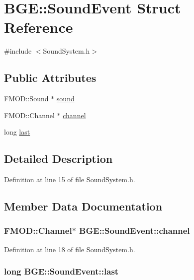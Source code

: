 \hypertarget{struct_b_g_e_1_1_sound_event}{\section{B\-G\-E\-:\-:Sound\-Event Struct Reference}
\label{struct_b_g_e_1_1_sound_event}
}


{\ttfamily \#include $<$Sound\-System.\-h$>$}

\subsection*{Public Attributes}
\begin{DoxyCompactItemize}
\item 
F\-M\-O\-D\-::\-Sound $\ast$ \hyperlink{struct_b_g_e_1_1_sound_event_ab7bb299636b2efed16e6a7d99c08053a}{sound}
\item 
F\-M\-O\-D\-::\-Channel $\ast$ \hyperlink{struct_b_g_e_1_1_sound_event_aa77841a892bc12252225257d963cae20}{channel}
\item 
long \hyperlink{struct_b_g_e_1_1_sound_event_a28ec34fdcc697a98ee996c5fbc2c351e}{last}
\end{DoxyCompactItemize}


\subsection{Detailed Description}


Definition at line 15 of file Sound\-System.\-h.



\subsection{Member Data Documentation}
\hypertarget{struct_b_g_e_1_1_sound_event_aa77841a892bc12252225257d963cae20}{
\subsubsection[{channel}]{\setlength{\rightskip}{0pt plus 5cm}F\-M\-O\-D\-::\-Channel$\ast$ B\-G\-E\-::\-Sound\-Event\-::channel}}\label{struct_b_g_e_1_1_sound_event_aa77841a892bc12252225257d963cae20}


Definition at line 18 of file Sound\-System.\-h.

\hypertarget{struct_b_g_e_1_1_sound_event_a28ec34fdcc697a98ee996c5fbc2c351e}{
\subsubsection[{last}]{\setlength{\rightskip}{0pt plus 5cm}long B\-G\-E\-::\-Sound\-Event\-::last}}\label{struct_b_g_e_1_1_sound_event_a28ec34fdcc697a98ee996c5fbc2c351e}


